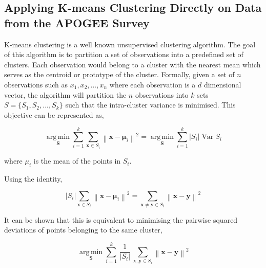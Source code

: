 \subsection{Applying K-means Clustering Directly on Data from the APOGEE Survey}

K-means clustering is a well known unsupervised clustering algorithm. The goal of this algorithm is to partition a set of observations into a predefined set of clusters. Each observation would belong to a cluster with the nearest mean which serves as the centroid or prototype of the cluster\cite{macqueen1967some}. Formally, given a set of $n$ observations such as \(x_1,x_2,...,x_n\) where each observation is a $d$ dimensional vector, the algorithm will partition the $n$ observations into $k$ sets $S=\{S_1,S_2,...,S_k\}$ such that the intra-cluster variance is minimised. This objective can be represented as,

\begin{equation}
{\underset {\mathbf {S} }{\operatorname {arg\,min} }}\sum _{i=1}^{k}\sum _{\mathbf {x} \in S_{i}}\left\|\mathbf {x} -{\boldsymbol {\mu }}_{i}\right\|^{2}={\underset {\mathbf {S} }{\operatorname {arg\,min} }}\sum _{i=1}^{k}|S_{i}|\operatorname {Var} S_{i}
\end{equation}

where $\mu_i$ is the mean of the points in $S_i$. 

Using the identity,

\begin{equation}
    |S_{i}|\sum _{\mathbf {x} \in S_{i}}\left\|\mathbf {x} -{\boldsymbol {\mu }}_{i}\right\|^{2}=\sum _{\mathbf {x} \neq \mathbf {y} \in S_{i}}\left\|\mathbf {x} -\mathbf {y} \right\|^{2}
\end{equation}

It can be shown that this is equivalent to minimising the pairwise squared deviations of points belonging to the same cluster,

\begin{equation}
{\underset {\mathbf {S} }{\operatorname {arg\,min} }}\sum _{i=1}^{k}\,{\frac {1}{|S_{i}|}}\,\sum _{\mathbf {x} ,\mathbf {y} \in S_{i}}\left\|\mathbf {x} -\mathbf {y} \right\|^{2}
\end{equation}

